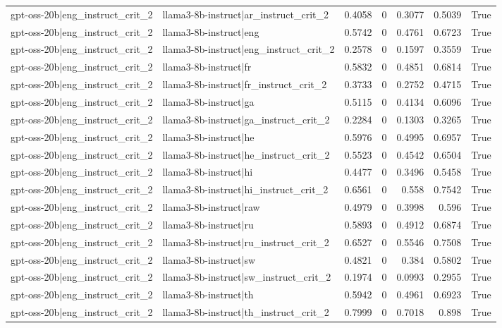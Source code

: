 \begin{table}
\begin{tabular}{l l r r r r l}
gpt-oss-20b|eng_instruct_crit_2 & llama3-8b-instruct|ar_instruct_crit_2 & 0.4058 & 0 & 0.3077 & 0.5039 & True \\
gpt-oss-20b|eng_instruct_crit_2 & llama3-8b-instruct|eng & 0.5742 & 0 & 0.4761 & 0.6723 & True \\
gpt-oss-20b|eng_instruct_crit_2 & llama3-8b-instruct|eng_instruct_crit_2 & 0.2578 & 0 & 0.1597 & 0.3559 & True \\
gpt-oss-20b|eng_instruct_crit_2 & llama3-8b-instruct|fr & 0.5832 & 0 & 0.4851 & 0.6814 & True \\
gpt-oss-20b|eng_instruct_crit_2 & llama3-8b-instruct|fr_instruct_crit_2 & 0.3733 & 0 & 0.2752 & 0.4715 & True \\
gpt-oss-20b|eng_instruct_crit_2 & llama3-8b-instruct|ga & 0.5115 & 0 & 0.4134 & 0.6096 & True \\
gpt-oss-20b|eng_instruct_crit_2 & llama3-8b-instruct|ga_instruct_crit_2 & 0.2284 & 0 & 0.1303 & 0.3265 & True \\
gpt-oss-20b|eng_instruct_crit_2 & llama3-8b-instruct|he & 0.5976 & 0 & 0.4995 & 0.6957 & True \\
gpt-oss-20b|eng_instruct_crit_2 & llama3-8b-instruct|he_instruct_crit_2 & 0.5523 & 0 & 0.4542 & 0.6504 & True \\
gpt-oss-20b|eng_instruct_crit_2 & llama3-8b-instruct|hi & 0.4477 & 0 & 0.3496 & 0.5458 & True \\
gpt-oss-20b|eng_instruct_crit_2 & llama3-8b-instruct|hi_instruct_crit_2 & 0.6561 & 0 & 0.558 & 0.7542 & True \\
gpt-oss-20b|eng_instruct_crit_2 & llama3-8b-instruct|raw & 0.4979 & 0 & 0.3998 & 0.596 & True \\
gpt-oss-20b|eng_instruct_crit_2 & llama3-8b-instruct|ru & 0.5893 & 0 & 0.4912 & 0.6874 & True \\
gpt-oss-20b|eng_instruct_crit_2 & llama3-8b-instruct|ru_instruct_crit_2 & 0.6527 & 0 & 0.5546 & 0.7508 & True \\
gpt-oss-20b|eng_instruct_crit_2 & llama3-8b-instruct|sw & 0.4821 & 0 & 0.384 & 0.5802 & True \\
gpt-oss-20b|eng_instruct_crit_2 & llama3-8b-instruct|sw_instruct_crit_2 & 0.1974 & 0 & 0.0993 & 0.2955 & True \\
gpt-oss-20b|eng_instruct_crit_2 & llama3-8b-instruct|th & 0.5942 & 0 & 0.4961 & 0.6923 & True \\
gpt-oss-20b|eng_instruct_crit_2 & llama3-8b-instruct|th_instruct_crit_2 & 0.7999 & 0 & 0.7018 & 0.898 & True \\

\end{tabular}
\end{table}
